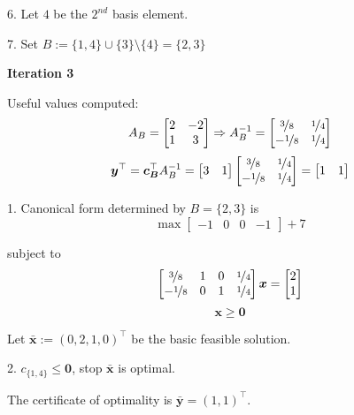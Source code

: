 6. Let $ 4 $ be the $ 2^{nd} $ basis element.

7. Set $ B:=\{1,4\}\cup \{3\}\setminus\{4\}=\{2,3\} $

\textbf{Iteration 3}

Useful values computed:
\[ A_B=
\begin{bmatrix}
    2 & -2\\
    1 & 3\\
\end{bmatrix} \Rightarrow
A_B^{-1}=
\begin{bmatrix}
    \nicefrac{3}{8} & \nicefrac{1}{4} \\
    -\nicefrac{1}{8} & \nicefrac{1}{4} 
\end{bmatrix} \]
\[ \bm{y}^\top=\bm{c_B}^\top A_B^{-1}=
\begin{bmatrix}
    3 & 1
\end{bmatrix}
\begin{bmatrix}
    \nicefrac{3}{8} & \nicefrac{1}{4} \\
    -\nicefrac{1}{8} & \nicefrac{1}{4} 
\end{bmatrix}=
\begin{bmatrix}
    1 & 1
\end{bmatrix}\]

1. Canonical form determined by $ B=\{2,3\} $ is
\[ \max
\begin{bmatrix}
    -1 & 0 & 0 & -1
\end{bmatrix} + 7\]

subject to
\[ 
\begin{bmatrix}
    \nicefrac{3}{8} & 1 & 0 & \nicefrac{1}{4} \\
    -\nicefrac{1}{8} & 0 & 1 & \nicefrac{1}{4}
\end{bmatrix}\bm{x}=
\begin{bmatrix}
    2\\
    1
\end{bmatrix}\]
\[ \bm{x}\ge \bm{0} \]

Let $ \bm{\bar{x}}:=(0,2,1,0)^\top $ be the basic feasible solution.

2. $ c_{\{1,4\}}\le \bm{0} $, stop $ \bm{\bar{x}} $ is optimal.

The certificate of optimality is $ \bm{\bar{y}}=(1,1)^\top $.


